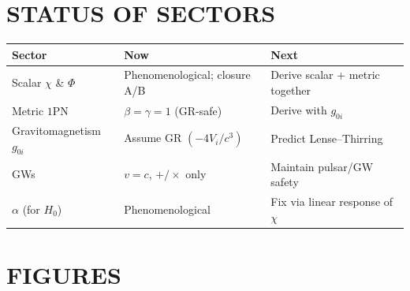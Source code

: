 \documentclass[
]{article}
\begin{document}
\section{STATUS OF SECTORS}\label{status-of-sectors}

\begin{longtable}[]{@{}
  >{\raggedright\arraybackslash}p{}
  >{\raggedright\arraybackslash}p{}
  >{\raggedright\arraybackslash}p{}@{}}
\toprule\noalign{}
\begin{minipage}[b]{\linewidth}\raggedright
\textbf{Sector}
\end{minipage} & \begin{minipage}[b]{\linewidth}\raggedright
\textbf{Now}
\end{minipage} & \begin{minipage}[b]{\linewidth}\raggedright
\textbf{Next}
\end{minipage} \\
\midrule\noalign{}
\endhead
\bottomrule\noalign{}
\endlastfoot
Scalar \(\chi\) \& \(\Phi\) & Phenomenological; closure A/B & Derive
scalar + metric together \\
Metric \(1\)PN & \(\beta = \gamma = 1\) (GR-safe) & Derive with
\(g_{0i}\) \\
Gravitomagnetism \(g_{0i}\) & Assume GR \(( - 4V_{i}/c^{3})\) & Predict
Lense--Thirring \\
GWs & \(v = c\), \(+ / \times\) only & Maintain pulsar/GW safety \\
\(\alpha\) (for \(H_{0}\)) & Phenomenological & Fix via linear response
of \(\chi\) \\
\end{longtable}

\textbf{\hfill\break
}

\section{FIGURES}\label{figures}
\end{document}
